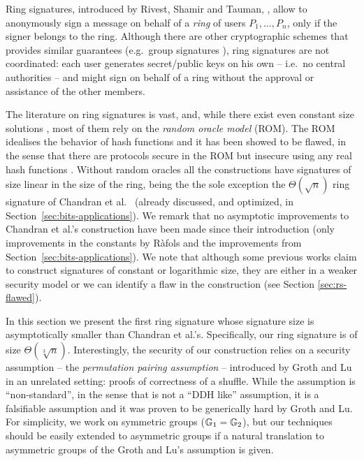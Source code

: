 Ring signatures, introduced by Rivest, Shamir and Tauman, \cite{AC:RivShaTau01}, allow to anonymously sign a message on behalf of a \emph{ring} of users $P_1,\ldots,P_n$, only if the signer belongs to the ring. Although there are other cryptographic schemes that provides similar guarantees (e.g.~group signatures \cite{EC:ChaVan91}), ring signatures are not coordinated: each user generates secret/public keys on his own -- i.e.~no central authorities -- and might sign on behalf of a ring without the approval or assistance of the other members.


The literature on ring signatures is vast, and, while there exist even constant size solutions \cite{EC:DKNS04}, most of them rely on the \emph{random oracle model} (ROM). The ROM idealises the behavior of hash functions and it has been showed to be flawed, in the sense that there are protocols secure in the ROM but insecure using any real hash functions \cite{STOC:CanGolHal98}. Without random oracles all the constructions have signatures of size linear in the size of the ring, being the the sole exception the $\Theta(\sqrt{n})$ ring signature of Chandran et al.~\cite{ICALP:ChaGroSah07} (already discussed, and optimized, in Section~\ref{sec:bits-applications}). 
We remark that no asymptotic improvements to Chandran et al.'s construction have been made since their introduction (only improvements in the constants by R\`afols \cite{TCC:Rafols15} and the improvements from Section~\ref{sec:bits-applications}). We note that although some previous works claim to construct signatures of constant \cite{ACISP:BosDasRan15} or logarithmic \cite{IET:GriSusPla16} size, they are either in a weaker security model or we can identify a flaw in the construction (see Section \ref{sec:rs-flawed}). 


In this section we present the first ring signature whose signature size is asymptotically smaller than Chandran et al.'s. Specifically, our ring signature is of size $\Theta(\sqrt[3]{n})$. Interestingly, the security of our construction relies on a security assumption -- the \emph{permutation pairing assumption} -- introduced by Groth and Lu \cite{AC:GroLu07} in an unrelated setting: proofs of correctness of a shuffle. While the assumption is ``non-standard'', in the sense that is not a ``DDH like'' assumption, it is a falsifiable assumption and it was proven to be generically hard by Groth and Lu. For simplicity, we work on symmetric groups ($\mathbb{G}_1=\mathbb{G}_2$), but our techniques should be easily extended to asymmetric groups if a natural translation to asymmetric groups of the Groth and Lu's assumption is given.

